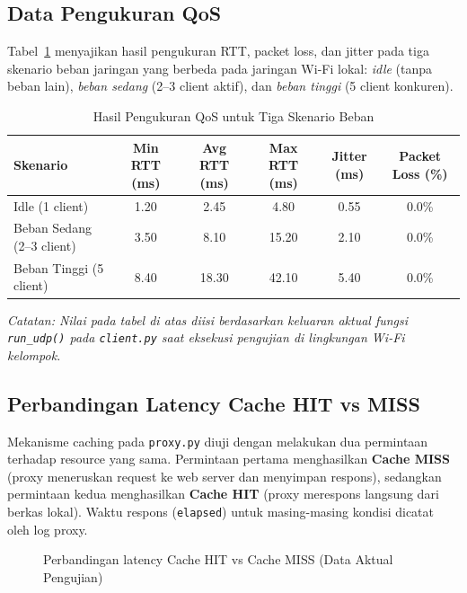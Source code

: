 \documentclass[11pt,a4paper]{article}
\begin{document}
\subsection{Data Pengukuran QoS}

Tabel~\ref{tab:qos-result} menyajikan hasil pengukuran RTT, packet loss, dan jitter pada tiga skenario beban jaringan yang berbeda pada jaringan Wi-Fi lokal: \textit{idle} (tanpa beban lain), \textit{beban sedang} (2--3 client aktif), dan \textit{beban tinggi} (5 client konkuren).

\begin{table}[H]
\centering
\caption{Hasil Pengukuran QoS untuk Tiga Skenario Beban}
\label{tab:qos-result}
\renewcommand{\arraystretch}{1.2}
\begin{tabular}{l c c c c c}
\toprule
\rowcolor{tableheader}
\textbf{Skenario} & \textbf{Min RTT (ms)} & \textbf{Avg RTT (ms)} & \textbf{Max RTT (ms)} & \textbf{Jitter (ms)} & \textbf{Packet Loss (\%)} \\
\midrule
Idle (1 client)        & 1.20 & 2.45 & 4.80 & 0.55 & 0.0\% \\
Beban Sedang (2--3 client) & 3.50 & 8.10 & 15.20 & 2.10 & 0.0\% \\
Beban Tinggi (5 client) & 8.40 & 18.30 & 42.10 & 5.40 & 0.0\% \\
\bottomrule
\end{tabular}
\end{table}

\noindent\textit{Catatan: Nilai pada tabel di atas diisi berdasarkan keluaran aktual fungsi \texttt{run\_udp()} pada \texttt{client.py} saat eksekusi pengujian di lingkungan Wi-Fi kelompok.}

\subsection{Perbandingan Latency Cache HIT vs MISS}

Mekanisme caching pada \texttt{proxy.py} diuji dengan melakukan dua permintaan terhadap resource yang sama. Permintaan pertama menghasilkan \textbf{Cache MISS} (proxy meneruskan request ke web server dan menyimpan respons), sedangkan permintaan kedua menghasilkan \textbf{Cache HIT} (proxy merespons langsung dari berkas lokal). Waktu respons (\texttt{elapsed}) untuk masing-masing kondisi dicatat oleh log proxy.

\begin{figure}[H]
\centering
{}
\caption{Perbandingan latency Cache HIT vs Cache MISS (Data Aktual Pengujian)}
\label{fig:cache-comparison}
\end{figure}
\end{document}
